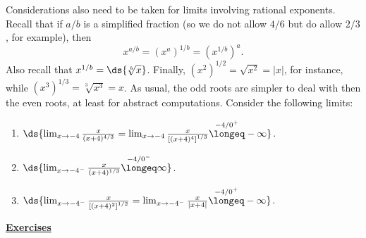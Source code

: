 Considerations also need to be taken for limits involving rational
exponents.  Recall that if $a/b$ is a simplified fraction
(so we do not allow $4/6$ but do allow $2/3$, for example), then
\begin{equation}x^{a/b}=\left(x^a\right)^{1/b}=\left(x^{1/b}\right)^a.
\end{equation}
Also recall that $x^{1/b}=\ds{\sqrt[b]{x}}$. Finally,
$(x^2)^{1/2}=\sqrt{x^2}=|x|$, for instance, while $(x^3)^{1/3}
=\sqrt[3]{x^3}=x$.  As usual, the odd roots are simpler to
deal with then the even roots, at least for abstract computations.
\newpage
\bex Consider the following limits:
\begin{enumerate}
\item $\ds{\lim_{x\to-4}\frac{x}{(x+4)^{4/3}}=\lim_{x\to-4}
        \frac{x}{\left[(x+4)^4\right]^{1/3}}\overset{-4/0^+}\longeq
        -\infty}$.
\item $\ds{\lim_{x\to-4^-}\frac{x}{(x+4)^{1/3}}\overset{-4/0^-}\longeq
        \infty}$.
\item $\ds{\lim_{x\to-4^-}\frac{x}{\left[(x+4)^2\right]^{1/2}}=\lim_{x\to-4^-}
        \frac{x}{|x+4|}\overset{-4/0^+}\longeq
        -\infty}$.
\end{enumerate}
\eex
\begin{center}
\underline{\Large{\bf Exercises}}\end{center}
